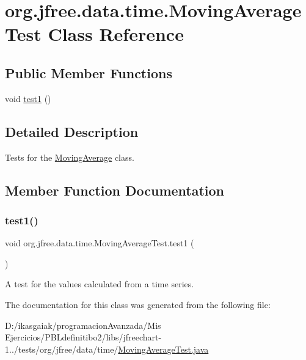 \hypertarget{classorg_1_1jfree_1_1data_1_1time_1_1_moving_average_test}{}\section{org.\+jfree.\+data.\+time.\+Moving\+Average\+Test Class Reference}
\label{classorg_1_1jfree_1_1data_1_1time_1_1_moving_average_test}
\subsection*{Public Member Functions}
\begin{DoxyCompactItemize}
\item 
void \mbox{\hyperlink{classorg_1_1jfree_1_1data_1_1time_1_1_moving_average_test_a3d83f235d0248f9ca30b59f8065e0c58}{test1}} ()
\end{DoxyCompactItemize}


\subsection{Detailed Description}
Tests for the \mbox{\hyperlink{classorg_1_1jfree_1_1data_1_1time_1_1_moving_average}{Moving\+Average}} class. 

\subsection{Member Function Documentation}
\mbox{\label{classorg_1_1jfree_1_1data_1_1time_1_1_moving_average_test_a3d83f235d0248f9ca30b59f8065e0c58}} 
\subsubsection{\texorpdfstring{test1()}{test1()}}
{\footnotesize\ttfamily void org.\+jfree.\+data.\+time.\+Moving\+Average\+Test.\+test1 (\begin{DoxyParamCaption}{ }\end{DoxyParamCaption})}

A test for the values calculated from a time series. 

The documentation for this class was generated from the following file\+:\begin{DoxyCompactItemize}
\item 
D\+:/ikasgaiak/programacion\+Avanzada/\+Mis Ejercicios/\+P\+B\+Ldefinitibo2/libs/jfreechart-\/1../tests/org/jfree/data/time/\mbox{\hyperlink{_moving_average_test_8java}{Moving\+Average\+Test.\+java}}\end{DoxyCompactItemize}
